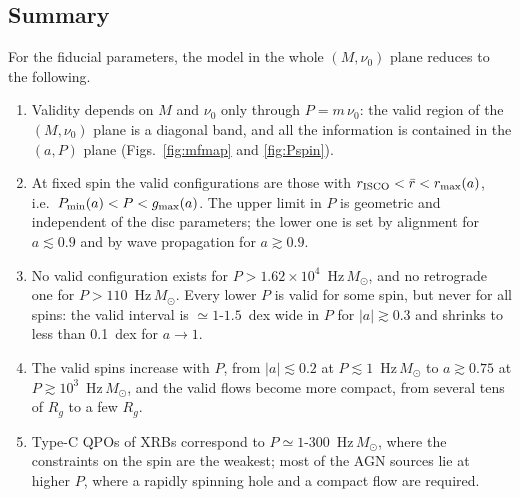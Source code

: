 \subsection{Summary}
\label{sec4:summary}

For the fiducial parameters, the model in the whole $(M,\nu_0)$ plane reduces to the following.
\begin{enumerate}[I]
    \item Validity depends on $M$ and $\nu_0$ only through $P=m\,\nu_0$: the valid region of the $(M,\nu_0)$ plane is a diagonal band, and all the information is contained in the $(a,P)$ plane (Figs.~\ref{fig:mfmap} and \ref{fig:Pspin}).
    \item At fixed spin the valid configurations are those with $r_\textup{ISCO}<\bar r<r_\textup{max}(a)$, i.e.\ $P_\textup{min}(a)<P<g_\textup{max}(a)$.
    The upper limit in $P$ is geometric and independent of the disc parameters; the lower one is set by alignment for $a\lesssim0.9$ and by wave propagation for $a\gtrsim0.9$.
    \item No valid configuration exists for $P>1.62\times10^4$~Hz\,$M_\odot$, and no retrograde one for $P>110$~Hz\,$M_\odot$.
    Every lower $P$ is valid for some spin, but never for all spins: the valid interval is $\simeq1$-$1.5$~dex wide in $P$ for $|a|\gtrsim0.3$ and shrinks to less than 0.1~dex for $a\to1$.
    \item The valid spins increase with $P$, from $|a|\lesssim0.2$ at $P\lesssim1$~Hz\,$M_\odot$ to $a\gtrsim0.75$ at $P\gtrsim10^3$~Hz\,$M_\odot$, and the valid flows become more compact, from several tens of $R_g$ to a few $R_g$.
    \item Type-C QPOs of XRBs correspond to $P\simeq1$-$300$~Hz\,$M_\odot$, where the constraints on the spin are the weakest; most of the AGN sources lie at higher $P$, where a rapidly spinning hole and a compact flow are required.
\end{enumerate}
